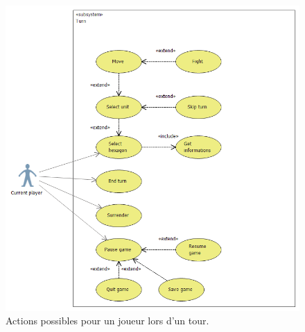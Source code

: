 		
		\begin{figure}
			\begin{center}
				\includegraphics[width=1\textwidth]{figure/cas_utilisation_player_turn.png}
			\end{center}
			\caption{Actions possibles pour un joueur lors d'un tour.}
			\label{fig:use2}
		\end{figure}
		
